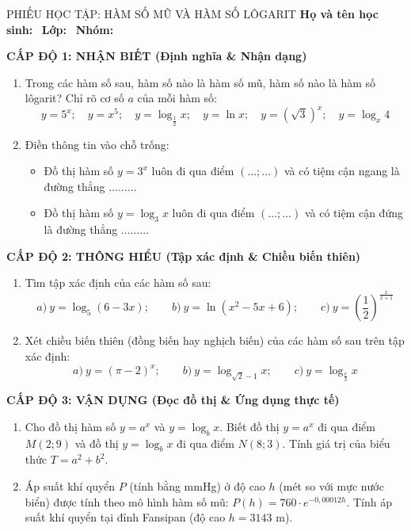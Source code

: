 \documentclass[12pt, a4paper]{article}
\begin{document}
\begin{pedabox}{PHIẾU HỌC TẬP: HÀM SỐ MŨ VÀ HÀM SỐ LÔGARIT}
\textbf{Họ và tên học sinh:} \dotfill \ \textbf{Lớp:} \dotfill \ \textbf{Nhóm:} \dotfill

\noindent \textbf{CẤP ĐỘ 1: NHẬN BIẾT (Định nghĩa \& Nhận dạng)}
\begin{enumerate}[leftmargin=0.6cm]
    \item Trong các hàm số sau, hàm số nào là hàm số mũ, hàm số nào là hàm số lôgarit? Chỉ rõ cơ số $a$ của mỗi hàm số:
    $$y = 5^x; \quad y = x^5; \quad y = \log_{\frac{1}{2}} x; \quad y = \ln x; \quad y = (\sqrt{3})^x; \quad y = \log_x 4$$
    \item Điền thông tin vào chỗ trống:
    \begin{itemize}
        \item Đồ thị hàm số $y = 3^x$ luôn đi qua điểm $(\dots; \dots)$ và có tiệm cận ngang là đường thẳng $\dots\dots\dots$
        \item Đồ thị hàm số $y = \log_3 x$ luôn đi qua điểm $(\dots; \dots)$ và có tiệm cận đứng là đường thẳng $\dots\dots\dots$
    \end{itemize}
\end{enumerate}

\noindent \textbf{CẤP ĐỘ 2: THÔNG HIỂU (Tập xác định \& Chiều biến thiên)}
\begin{enumerate}[leftmargin=0.6cm]
    \item Tìm tập xác định của các hàm số sau:
    $$a) \ y = \log_5 (6 - 3x); \qquad b) \ y = \ln(x^2 - 5x + 6); \qquad c) \ y = \left(\dfrac{1}{2}\right)^{\frac{x}{x+1}}$$
    \item Xét chiều biến thiên (đồng biến hay nghịch biến) của các hàm số sau trên tập xác định:
    $$a) \ y = (\pi - 2)^x; \qquad b) \ y = \log_{\sqrt{2} - 1} x; \qquad c) \ y = \log_{\frac{e}{3}} x$$
\end{enumerate}

\noindent \textbf{CẤP ĐỘ 3: VẬN DỤNG (Đọc đồ thị \& Ứng dụng thực tế)}
\begin{enumerate}[leftmargin=0.6cm]
    \item Cho đồ thị hàm số $y = a^x$ và $y = \log_b x$. Biết đồ thị $y = a^x$ đi qua điểm $M(2; 9)$ và đồ thị $y = \log_b x$ đi qua điểm $N(8; 3)$. Tính giá trị của biểu thức $T = a^2 + b^2$.
    \item Áp suất khí quyển $P$ (tính bằng mmHg) ở độ cao $h$ (mét so với mực nước biển) được tính theo mô hình hàm số mũ: $P(h) = 760 \cdot e^{-0{,}00012 h}$. Tính áp suất khí quyển tại đỉnh Fansipan (độ cao $h = 3143\text{ m}$).
\end{enumerate}
\end{pedabox}
\end{document}
